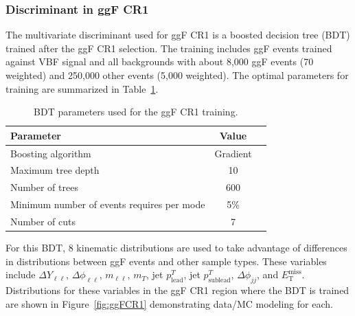 \newpage

\subsubsection{Discriminant in ggF CR1}
The multivariate discriminant used for ggF CR1 is a boosted decision tree (BDT) trained after the ggF CR1 selection. The training includes ggF events trained against VBF signal and all backgrounds with about 8,000 ggF events (70 weighted) and 250,000 other events (5,000 weighted). The optimal parameters for training are summarized in Table~\ref{tab:ggFCR1BDTparameters}.
\begin{table}[h!]
\centering
\begin{tabular}{|l|c|c|}
\hline
Parameter                                    & Value     \\
\hline
Boosting algorithm                           & Gradient \\
Maximum tree depth                           &  10      \\
Number of trees                              &  600    \\
Minimum number of events requires per mode   &  5\%     \\ 
Number of cuts                               &  7       \\
\hline
\end{tabular}
\caption{BDT parameters used for the ggF CR1 training.}
\label{tab:ggFCR1BDTparameters}
\end{table}
 
For this BDT, 8 kinematic distributions are used to take advantage of differences in distributions between ggF events and other sample types. These variables include $\Delta Y_{\ell\ell}$, $\Delta \phi_{\ell\ell}$, $m_{\ell\ell}$, $m_T$, jet $p^T_{\text{lead}}$, jet $p^T_{\text{sublead}}$, $\Delta \phi_{jj}$, and $\ensuremath{E_{\text{T}}^{\text{miss}}}$. Distributions for these variables in the ggF CR1 region where the BDT is trained are shown in Figure~\ref{fig:ggFCR1} demonstrating data/MC modeling for each.

